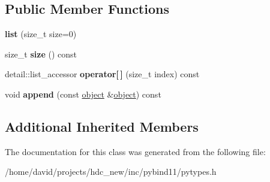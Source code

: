\subsection*{Public Member Functions}
\begin{DoxyCompactItemize}
\item 
{\bfseries list} (size\+\_\+t size=0)\hypertarget{classlist_a605b8e11c689100c84d14f1e8f3ec5ba}{}\label{classlist_a605b8e11c689100c84d14f1e8f3ec5ba}

\item 
size\+\_\+t {\bfseries size} () const \hypertarget{classlist_aea8716069b0773124fe035c60f43bbd8}{}\label{classlist_aea8716069b0773124fe035c60f43bbd8}

\item 
detail\+::list\+\_\+accessor {\bfseries operator\mbox{[}$\,$\mbox{]}} (size\+\_\+t index) const \hypertarget{classlist_a3d7879074d2221089c409aac7c753df3}{}\label{classlist_a3d7879074d2221089c409aac7c753df3}

\item 
void {\bfseries append} (const \hyperlink{classobject}{object} \&\hyperlink{classobject}{object}) const \hypertarget{classlist_a969fad9e12e42c08db9823a5cc66194a}{}\label{classlist_a969fad9e12e42c08db9823a5cc66194a}

\end{DoxyCompactItemize}
\subsection*{Additional Inherited Members}


The documentation for this class was generated from the following file\+:\begin{DoxyCompactItemize}
\item 
/home/david/projects/hdc\+\_\+new/inc/pybind11/pytypes.\+h\end{DoxyCompactItemize}
